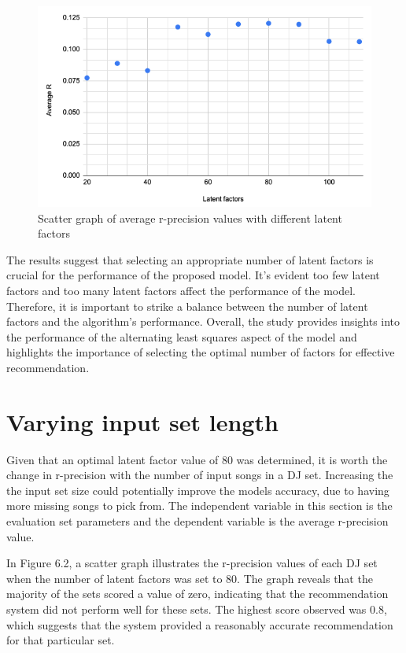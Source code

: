 \begin{figure}[H]
	\includegraphics[scale=0.6]{images/average_r_over_latent}
	\centering
	\caption{Scatter graph of average r-precision values with different latent factors} 
\end{figure}

The results suggest that selecting an appropriate number of latent factors is crucial for the performance of the proposed model. It's evident too few latent factors and too many latent factors affect the performance of the model. Therefore, it is important to strike a balance between the number of latent factors and the algorithm's performance. Overall, the study provides insights into the performance of the alternating least squares aspect of the model and highlights the importance of selecting the optimal number of factors for effective recommendation.

\section{Varying input set length}
Given that an optimal latent factor value of 80 was determined, it is worth the change in r-precision with the number of input songs in a DJ set. Increasing the the input set size could potentially improve the models accuracy, due to having more missing songs to pick from. The independent variable in this section is the evaluation set parameters and the dependent variable is the average r-precision value.

In Figure 6.2, a scatter graph illustrates the r-precision values of each DJ set when the number of latent factors was set to 80. The graph reveals that the majority of the sets scored a value of zero, indicating that the recommendation system did not perform well for these sets. The highest score observed was 0.8, which suggests that the system provided a reasonably accurate recommendation for that particular set.

